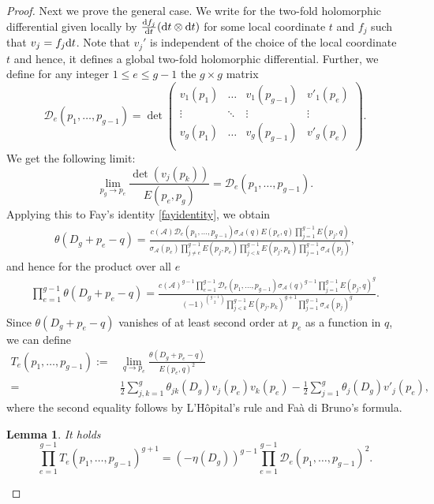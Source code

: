 \documentclass[pdftex]{sigma}
\numberwithin{equation}{section}
\newtheorem{Lemma}[Theorem]{Lemma}
\begin{document}
\begin{proof}
	Next we prove the general case. We write  for the two-fold holomorphic differential given locally by $\frac{{\rm d}f_j}{{\rm d}t}({\rm d}t\otimes {\rm d}t)$ for some local coordinate $t$ and $f_j$ such that $v_j=f_j{\rm d}t$. Note that $v_j'$ is independent of the choice of the local coordinate $t$ and hence, it defines a global two-fold holomorphic differential.
	Further, we define for any integer $1\le e\le g-1$ the $g\times g$ matrix
	\[\mathscr{D}_{e}(p_1,\dots,p_{g-1})=\det\begin{pmatrix}
		v_1(p_1)&\dots&v_1(p_{g-1})&v'_1(p_{e})\\
		\vdots&\ddots &\vdots&\vdots\\
		v_g(p_1)&\dots&v_g(p_{g-1})&v'_g(p_{e})\\
	\end{pmatrix}.\]
	We get the following limit:
	\[\lim_{p_g\to p_e}\frac{\det(v_j(p_k))}{E(p_e,p_g)}=\mathscr{D}_e(p_1,\dots,p_{g-1}).\]
	Applying this to Fay's identity \eqref{fayidentity}, we obtain
	\begin{align}\label{equ_theta-dg-pe}
		\theta(D_g+p_e-q)=\frac{c(\mathcal{A}) \mathscr{D}_e(p_1,\dots,p_{g-1})\sigma_{\mathcal{A}}(q) E(p_e,q)\prod_{j=1}^{g-1}E(p_j,q)}{\sigma_{\mathcal{A}}(p_e)\prod_{j\neq e}^{g-1}E(p_j,p_e)\prod_{j<k}^{g-1}E(p_j,p_k)\prod_{j=1}^{g-1}\sigma_{\mathcal{A}}(p_j)},
	\end{align}
	and hence for the product over all $e$
	\begin{align}\label{equ_theta-dg-pe2} \prod_{e=1}^{g-1}\theta(D_g+p_e-q)=\frac{c(\mathcal{A})^{g-1}\prod_{e=1}^{g-1}\mathscr{D}_e(p_1,\dots,p_{g-1})\sigma_{\mathcal{A}}(q)^{g-1}\prod_{j=1}^{g-1}E(p_j,q)^g}{(-1)^{\binom{g-1}{2}}\prod_{j<k}^{g-1}E(p_j,p_k)^{g+1}\prod_{j=1}^{g-1}\sigma_{\mathcal{A}}(p_j)^g}.
	\end{align}
	Since $\theta(D_g+p_e-q)$ vanishes of at least second order at $p_e$ as a function in $q$, we can define
	\begin{align}
		T_e(p_1,\dots,p_{g-1}):={}&\lim_{q\to p_e}\frac{\theta(D_g+p_e-q)}{E(p_e,q)^2} \nonumber\\
		={} &\frac{1}{2}\sum_{j,k=1}^g\theta_{jk}(D_g)v_{j}(p_e)v_{k}(p_e)-\frac{1}{2}\sum_{j=1}^g\theta_j(D_g)v'_{j}(p_e),\label{formulaTe}
	\end{align}
	where the second equality follows by L'H\^opital's rule and Fa\`a di Bruno's formula.
	\begin{Lemma}
		It holds
		\[\prod_{e=1}^{g-1}T_e(p_1,\dots,p_{g-1})^{g+1}=(-\eta(D_g))^{g-1}\prod_{e=1}^{g-1}\mathscr{D}_e(p_1,\dots,p_{g-1})^2.\]

\end{Lemma}
\end{proof}
\end{document}
